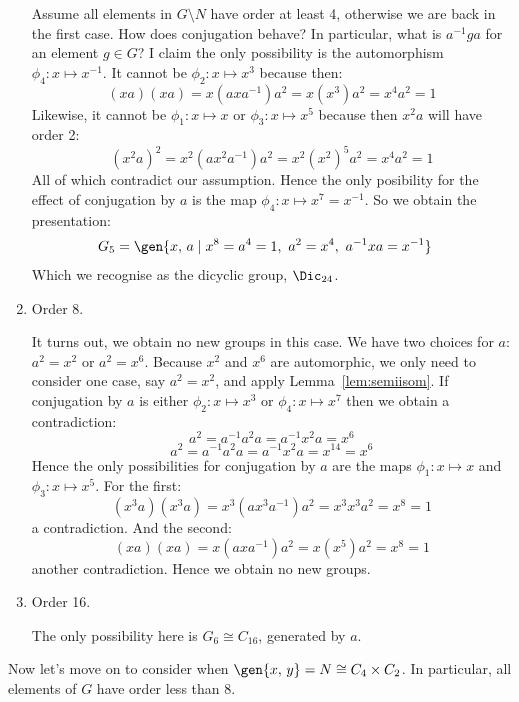 \begin{enumerate}
        Assume all elements in \(G\setminus N\) have order at least 4, otherwise we are back in the first case.
        How does conjugation behave?
        In particular, what is \(a^{-1}ga\) for an element \(g \in G\)?
        I claim the only possibility is the automorphism \(\phi_4:x\mapsto x^{-1}\).
        It cannot be \(\phi_2:x\mapsto x^3\) because then:
        \[(xa)(xa) = x(axa^{-1})a^2 = x(x^3) a^2 = x^4 a^2 = 1\]
        Likewise, it cannot be \(\phi_1:x\mapsto x\) or \(\phi_3:x\mapsto x^5\) because then \(x^2 a\) will have order 2:
        \[{(x^2 a)}^2 = x^2 (ax^2 a^{-1})a^2 = x^2 {(x^2)}^5 a^2 = x^4 a^2 = 1\]
        All of which contradict our assumption.
        Hence the only posibility for the effect of conjugation by \(a\) is the map \(\phi_4:x\mapsto x^7 = x^{-1}\).
        So we obtain the presentation:
        \begin{align*}
            G_5 &= \gen{x,\,a \mid x^8 = a^4 = 1,\ a^2 = x^4,\ a^{-1}xa = x^{-1}}
        \end{align*}
        Which we recognise as the dicyclic group, \(\Dic_{24}\).

    \item Order 8.

        It turns out, we obtain no new groups in this case.
        We have two choices for \(a\): \(a^2 = x^2\) or \(a^2 = x^6\).
        Because \(x^2\) and \(x^6\) are automorphic, we only need to consider one case, say \(a^2 = x^2\), and apply
        Lemma~\ref{lem:semiisom}.
        If conjugation by \(a\) is either \(\phi_2:x\mapsto x^3\) or \(\phi_4:x\mapsto x^7\) then we obtain a
        contradiction:
        \[a^2 = a^{-1}a^2 a = a^{-1}x^2 a = x^6\]
        \[a^2 = a^{-1}a^2 a = a^{-1}x^2 a = x^{14} = x^6\]
        Hence the only possibilities for conjugation by \(a\) are the maps \(\phi_1:x\mapsto x\) and \(\phi_3:x \mapsto
        x^5\).
        For the first:
        \[(x^3 a)(x^3 a) = x^3(ax^3 a^{-1})a^2 = x^3 x^3 a^2 = x^8 = 1\]
        a contradiction.
        And the second:
        \[(xa)(xa) = x(axa^{-1})a^2 = x(x^5)a^2 = x^8 = 1\]
        another contradiction.
        Hence we obtain no new groups.

    \item Order 16.

        The only possibility here is \(G_6 \cong C_{16}\), generated by \(a\).
\end{enumerate}

Now let's move on to consider when \(\gen{x,\,y} = N \cong C_4 \times C_2\).
In particular, all elements of \(G\) have order less than 8.

